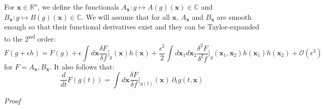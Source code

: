 \documentclass{article}
\newcommand{\fder}[2]{\frac{\delta #1}{\delta f}\Bigr|_{#2}}
\newcommand{\fdder}[2]{\frac{\delta^2 #1}{\delta^2 f}\Bigr|_{#2}}
\begin{document}
For $\mathbf{x}\in \mathbb{R}^n$, we define the functionals $A_\mathbf{x} : g \longmapsto A(g)(\mathbf{x})\in \mathbb{C}$ and $B_\mathbf{x} : g \longmapsto B(g)(\mathbf{x})\in \mathbb{C}$. We will assume that for all $\mathbf{x}$, $A_\mathbf{x}$ and $B_\mathbf{x}$ are smooth enough so that their functional derivatives exist and they can be Taylor-expanded to the 2\textsuperscript{nd} order:
\begin{equation}\label{Taylor}
    F(g+\epsilon h)=F(g)+\epsilon\int d\mathbf{x}\fder{F}{g}(\mathbf{x}) h(\mathbf{x})+\frac{\epsilon^2}{2}\int d\mathbf{x}_1d\mathbf{x}_2 \fdder{F}{g}(\mathbf{x}_1,\mathbf{x}_2)h(\mathbf{x}_1)h(\mathbf{x}_2)+\mathcal{O}(\epsilon^3)
\end{equation}
for $F=A_\mathbf{x},B_\mathbf{x}$. It also follows that:
\begin{equation}\label{totalder}
    \frac{d}{dt}F(g(t))=\int d\mathbf{x}\fder{F}{g(t)}(\mathbf{x})~\partial_t g(t,\mathbf{x})
\end{equation}

\bigskip\noindent
\textit{Proof}
\end{document}
